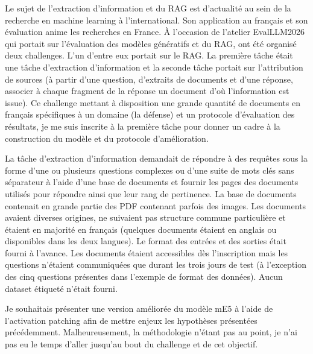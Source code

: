     Le sujet de l'extraction d'information et du RAG est d'actualité au sein de la recherche en machine learning à l'international. Son application au français et son évaluation anime les recherches en France. À l'occasion de l'atelier EvalLLM2026 qui portait sur l'évaluation des modèles génératifs et du RAG, ont été organisé deux challenges. L'un d'entre eux portait sur le RAG. La première tâche était une tâche d'extraction d'information et la seconde tâche portait sur l'attribution de sources (à partir d'une question, d'extraits de documents et d'une réponse, associer à chaque fragment de la réponse un document d'où l'information est issue). Ce challenge mettant à disposition une grande quantité de documents en français spécifiques à un domaine (la défense) et un protocole d'évaluation des résultats, je me suis inscrite à la première tâche pour donner un cadre à la construction du modèle et du protocole d'amélioration. 
    
    La tâche d'extraction d'information demandait de répondre à des requêtes sous la forme d'une ou plusieurs questions complexes ou d'une suite de mots clés sans séparateur à l'aide d'une base de documents et fournir les pages des documents utilisés pour répondre ainsi que leur rang de pertinence. La base de documents contenait en grande partie des PDF contenant parfois des images. Les documents avaient diverses origines, ne suivaient pas structure commune particulière et étaient en majorité en français (quelques documents étaient en anglais ou disponibles dans les deux langues).
    Le format des entrées et des sorties était fourni à l'avance. Les documents étaient accessibles dès l'inscription mais les questions n'étaient communiquées que durant les trois jours de test (à l'exception des cinq questions présentes dans l'exemple de format des données). Aucun dataset étiqueté n'était fourni. 
    
    Je souhaitais présenter une version améliorée du modèle mE5 à l'aide de l'activation patching afin de mettre enjeux les hypothèses présentées précédemment. Malheureusement, la méthodologie n'étant pas au point, je n'ai pas eu le temps d'aller jusqu'au bout du challenge et de cet objectif. %

